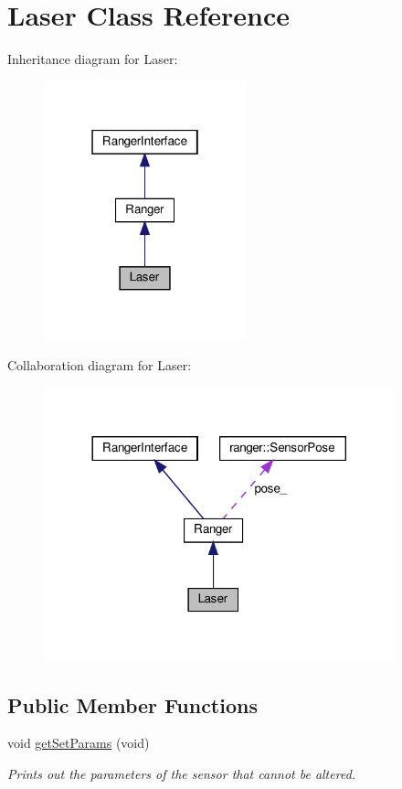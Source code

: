 \hypertarget{classLaser}{}\section{Laser Class Reference}
\label{classLaser}


Inheritance diagram for Laser\+:\nopagebreak
\begin{figure}[H]
\begin{center}
\leavevmode
\includegraphics[width=166pt]{classLaser__inherit__graph}
\end{center}
\end{figure}


Collaboration diagram for Laser\+:\nopagebreak
\begin{figure}[H]
\begin{center}
\leavevmode
\includegraphics[width=288pt]{classLaser__coll__graph}
\end{center}
\end{figure}
\subsection*{Public Member Functions}
\begin{DoxyCompactItemize}
\item 
\mbox{\label{classLaser_a5e1e9352d378edde419929165fa267d1}} 
void \hyperlink{classLaser_a5e1e9352d378edde419929165fa267d1}{get\+Set\+Params} (void)
\begin{DoxyCompactList}\small\item\em Prints out the parameters of the sensor that cannot be altered. \end{DoxyCompactList}\end{DoxyCompactItemize}
